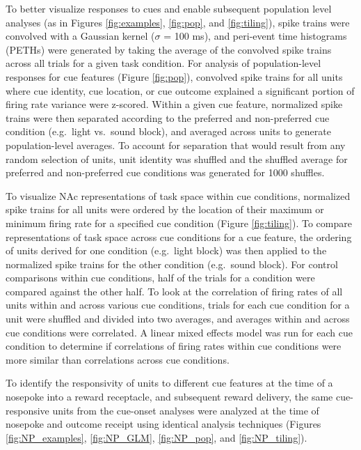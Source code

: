 \documentclass[11pt]{article}
\begin{document}
{To better visualize responses to cues and enable subsequent population
level analyses (as in Figures \ref{fig:examples}, \ref{fig:pop}, and
\ref{fig:tiling}), spike trains were convolved with a Gaussian kernel
($\sigma$ = 100 ms), and peri-event time histograms (PETHs) were
generated by taking the average of the convolved spike trains across all
trials for a given task condition. For analysis of population-level
responses for cue features (Figure \ref{fig:pop}), convolved spike
trains for all units where cue identity, cue location, or cue outcome
explained a significant portion of firing rate variance were
z-scored. Within a given cue feature, normalized spike trains were
then separated according to the preferred and non-preferred cue
condition (e.g.\ light vs.\ sound block), and averaged across units to
generate population-level averages. To account for separation that
would result from any random selection of units, unit identity was
shuffled and the shuffled average for preferred and non-preferred cue
conditions was generated for 1000 shuffles.

To visualize NAc representations of task space within cue conditions,
normalized spike trains for all units were ordered by the location of
their maximum or minimum firing rate for a specified cue condition
(Figure \ref{fig:tiling}). To compare representations of task space
across cue conditions for a cue feature, the ordering of units derived
for one condition (e.g.\ light block) was then applied to the
normalized spike trains for the other condition (e.g.\ sound
block). For control comparisons within cue conditions, half of the
trials for a condition were compared against the other half. To look
at the correlation of firing rates of all units within and across
various cue conditions, trials for each cue condition for a unit were
shuffled and divided into two averages, and averages within and across
cue conditions were correlated. A linear mixed effects model was run
for each cue condition to determine if correlations of firing rates
within cue conditions were more similar than correlations across cue
conditions.

To identify the responsivity of units to different cue features at the
time of a nosepoke into a reward receptacle, and subsequent reward
delivery, the same cue-responsive units from the cue-onset analyses
were analyzed at the time of nosepoke and outcome receipt using
identical analysis techniques (Figures \ref{fig:NP_examples},
\ref{fig:NP_GLM}, \ref{fig:NP_pop}, and \ref{fig:NP_tiling}).

}
\end{document}
